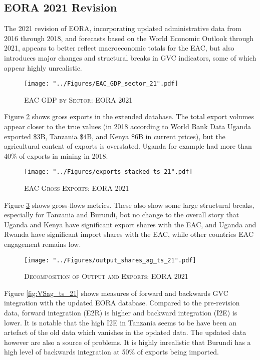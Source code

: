 \documentclass[a4paper]{article}
\begin{document}
\subsection*{EORA 2021 Revision}

The 2021 revision of EORA, incorporating updated administrative data from 2016 through 2018, and forecasts based on the World Economic Outlook through 2021, appears to better reflect macroeconomic totals for the EAC, but also introduces major changes and structural breaks in GVC indicators, some of which appear highly unrealistic. 

\begin{figure}[h!]
\centering
\caption{\label{fig:EAC_GDP_sec_21}\textsc{EAC GDP by Sector: EORA 2021}}
\texttt{[image: "../Figures/EAC\_GDP\_sector\_21".pdf]} %
\end{figure}
\FloatBarrier


Figure \ref{fig:exp21} shows gross exports in the extended database. The total export volumes appear closer to the true values (in 2018 according to World Bank Data Uganda exported \$3B, Tanzania \$4B, and Kenya \$6B in current prices), but the agricultural content of exports is overstated. Uganda for example had more than 40\% of exports in mining in 2018. 

\begin{figure}[h!]
\centering
\caption{\label{fig:exp21}\textsc{EAC Gross Exports: EORA 2021}}
\texttt{[image: "../Figures/exports\_stacked\_ts\_21".pdf]} %
\end{figure}
\FloatBarrier

Figure \ref{fig:outshares_ag_ts_21} shows gross-flows metrics. These also show some large structural breaks, especially for Tanzania and Burundi, bot no change to the overall story that Uganda and Kenya have significant export shares with the EAC, and Uganda and Rwanda have significant import shares with the EAC, while other countries EAC engagement remains low. 

\begin{figure}[h!]
\centering
\caption{\label{fig:outshares_ag_ts_21}\textsc{Decomposition of Output and Exports: EORA 2021}}
\texttt{[image: "../Figures/output\_shares\_ag\_ts\_21".pdf]} %
\end{figure}
\FloatBarrier

Figure \ref{fig:VSag_ts_21} shows measures of forward and backwards GVC integration with the updated EORA database. Compared to the pre-revision data, forward integration (E2R) is higher and backward integration (I2E) is lower. It is notable that the high I2E in Tanzania seems to be have been an artefact of the old data which vanishes in the opdated data. The updated data however are also a source of problems. It is highly inrealistic that Burundi has a high level of backwards integration at 50\% of exports being imported. 
\end{document}
